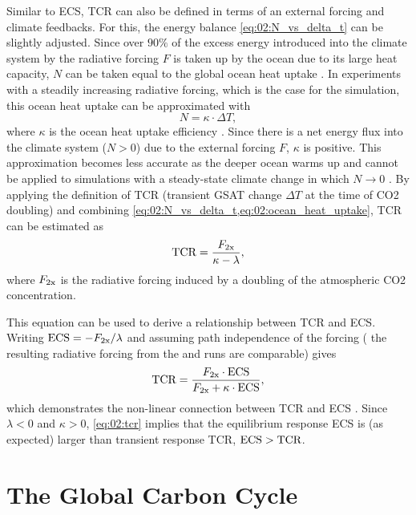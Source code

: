 Similar to \ac{ECS}, \ac{TCR} can also be defined in terms of an external
forcing and climate feedbacks. For this, the energy balance
\cref{eq:02:N_vs_delta_t} can be slightly adjusted. Since over $90 \unit{\%}$
of the excess energy introduced into the climate system by the radiative
forcing $F$ is taken up by the ocean due to its large heat capacity, $N$ can be
taken equal to the global ocean heat uptake \autocite{Knutti2017}. In
experiments with a steadily increasing radiative forcing, which is the case for
the \onepctcotwo{} simulation, this ocean heat uptake can be approximated with
\begin{equation}
  N = \kappa \cdot \Delta T,
  \label{eq:02:ocean_heat_uptake}
\end{equation}
where $\kappa$ is the ocean heat uptake efficiency \autocite{Gregory2008}.
Since there is a net energy flux into the climate system ($N > 0$) due to the
external forcing $F$, $\kappa$ is positive. This approximation becomes less
accurate as the deeper ocean warms up and cannot be applied to simulations with
a steady-state climate change in which $N \to 0$ \autocite{Gregory2009}. By
applying the definition of \ac{TCR} (transient \ac{GSAT} change $\Delta T$ at
the time of \ac{CO2} doubling) and combining
\cref{eq:02:N_vs_delta_t,eq:02:ocean_heat_uptake}, \ac{TCR} can be estimated as
\begin{equation}
  \textnormal{TCR} = \frac{F_{\textnormal{2x}}}{\kappa - \lambda},
  \label{eq:02:tcr}
\end{equation}
where $F_{\textnormal{2x}}$ is the radiative forcing induced by a doubling of the
atmospheric \ac{CO2} concentration.

This equation can be used to derive a relationship between \ac{TCR} and
\ac{ECS}. Writing $\textnormal{ECS} = -F_{\textnormal{2x}} / \lambda$ and assuming path
independence of the forcing (\ie{} the resulting radiative forcing from the
\onepctcotwo{} and  runs are comparable) gives
\begin{equation}
  \textnormal{TCR} = \frac{F_{\textnormal{2x}} \cdot \textnormal{ECS}}{F_{\textnormal{2x}} +
    \kappa \cdot \textnormal{ECS}},
  \label{eq:02:tcr_vs_ecs}
\end{equation}
which demonstrates the non-linear connection between \ac{TCR} and \ac{ECS}
\autocite{Gregory2008, Nijsse2020}. Since $\lambda < 0$ and $\kappa > 0$,
\cref{eq:02:tcr} implies that the equilibrium response \ac{ECS} is (as
expected) larger than transient response \ac{TCR}, \ie{} $\textnormal{ECS} >
\textnormal{TCR}$.


\section{The Global Carbon Cycle}
\label{sec:02:carbon_cycle}

